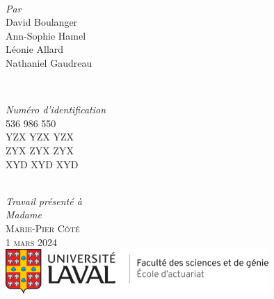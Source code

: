 \begin{titlepage}
\HRule \\[2cm]
\begin{minipage}{0.4\textwidth}
    \begin{flushleft} \large
    \emph{Par}\\
        David Boulanger \\
        Ann-Sophie Hamel \\
        Léonie Allard \\
        Nathaniel Gaudreau
    \end{flushleft}
\end{minipage}
~%
\begin{minipage}{0.4\textwidth}
    \begin{flushright} \large
    \emph{Numéro d'identification}\\
        536 986 550\\
        YZX YZX YZX\\
        ZYX ZYX ZYX\\
        XYD XYD XYD
    \end{flushright}
\end{minipage} \\[1.0cm]
\emph{Travail présenté à} \\
\emph{Madame} \\[0.1cm]
\textsc{\Large Marie-Pier Côté}\\[1.0cm]
\textsc{\large 1 mars 2024 }\\[1cm] %

\includegraphics[width = 10cm]{ul-actuariat}\\[1.5cm]
 
\vfill %

\end{titlepage}
%